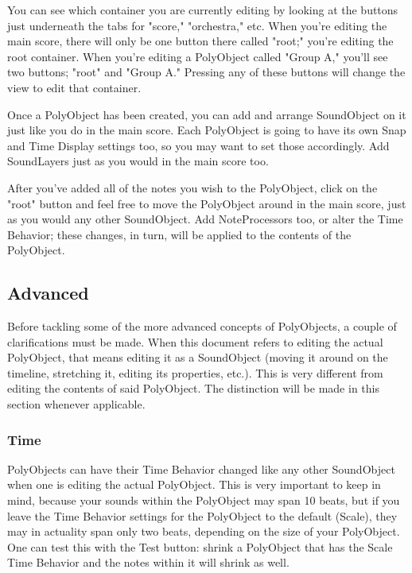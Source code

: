 You can see which container you are currently editing by looking at the
buttons just underneath the tabs for "score," "orchestra," etc. When
you're editing the main score, there will only be one button there
called "root;" you're editing the root container. When you're editing a
PolyObject called "Group A," you'll see two buttons; "root" and "Group
A." Pressing any of these buttons will change the view to edit that
container.

Once a PolyObject has been created, you can add and arrange SoundObject
on it just like you do in the main score. Each PolyObject is going to
have its own Snap and Time Display settings too, so you may want to set
those accordingly. Add SoundLayers just as you would in the main score
too.

After you've added all of the notes you wish to the PolyObject, click on
the "root" button and feel free to move the PolyObject around in the
main score, just as you would any other SoundObject. Add NoteProcessors
too, or alter the Time Behavior; these changes, in turn, will be applied
to the contents of the PolyObject.

\subsection{Advanced}

Before tackling some of the more advanced concepts of PolyObjects, a
couple of clarifications must be made. When this document refers to
editing the actual PolyObject, that means editing it as a SoundObject
(moving it around on the timeline, stretching it, editing its
properties, etc.). This is very different from editing the contents of
said PolyObject. The distinction will be made in this section whenever
applicable.

\subsubsection{Time}

PolyObjects can have their Time Behavior changed like any other
SoundObject when one is editing the actual PolyObject. This is very
important to keep in mind, because your sounds within the PolyObject may
span 10 beats, but if you leave the Time Behavior settings for the
PolyObject to the default (Scale), they may in actuality span only two
beats, depending on the size of your PolyObject. One can test this with
the Test button: shrink a PolyObject that has the Scale Time Behavior
and the notes within it will shrink as well.

